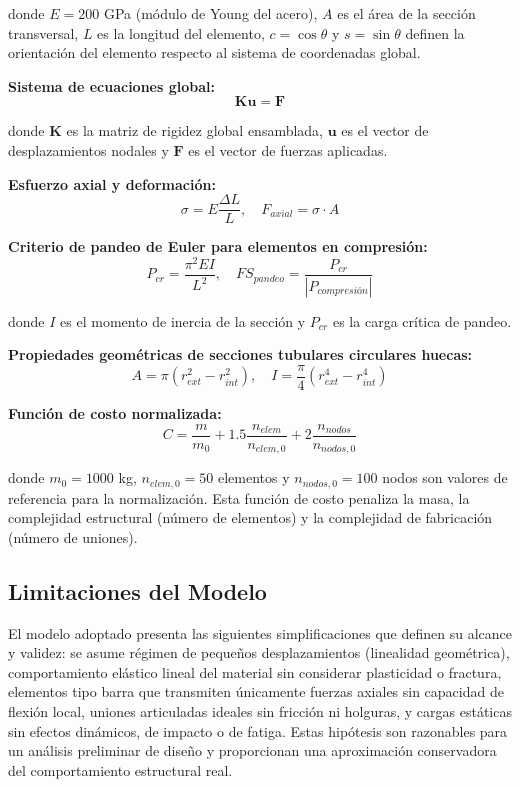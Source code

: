 \documentclass[10pt,a4paper]{article}
\begin{document}
donde $E = 200$ GPa (módulo de Young del acero), $A$ es el área de la sección transversal, $L$ es la longitud del elemento, $c = \cos\theta$ y $s = \sin\theta$ definen la orientación del elemento respecto al sistema de coordenadas global.

\textbf{Sistema de ecuaciones global:}
\begin{equation}
\mathbf{K}\mathbf{u} = \mathbf{F}
\end{equation}

donde $\mathbf{K}$ es la matriz de rigidez global ensamblada, $\mathbf{u}$ es el vector de desplazamientos nodales y $\mathbf{F}$ es el vector de fuerzas aplicadas.

\textbf{Esfuerzo axial y deformación:}
\begin{equation}
\sigma = E \frac{\Delta L}{L}, \quad F_{axial} = \sigma \cdot A
\end{equation}

\textbf{Criterio de pandeo de Euler para elementos en compresión:}
\begin{equation}
P_{cr} = \frac{\pi^2 EI}{L^2}, \quad FS_{pandeo} = \frac{P_{cr}}{|P_{compresión}|}
\end{equation}

donde $I$ es el momento de inercia de la sección y $P_{cr}$ es la carga crítica de pandeo.

\textbf{Propiedades geométricas de secciones tubulares circulares huecas:}
\begin{equation}
A = \pi(r_{ext}^2 - r_{int}^2), \quad I = \frac{\pi}{4}(r_{ext}^4 - r_{int}^4)
\end{equation}

\textbf{Función de costo normalizada:}
\begin{equation}
C = \frac{m}{m_0} + 1.5\frac{n_{elem}}{n_{elem,0}} + 2\frac{n_{nodos}}{n_{nodos,0}}
\end{equation}

donde $m_0 = 1000$ kg, $n_{elem,0} = 50$ elementos y $n_{nodos,0} = 100$ nodos son valores de referencia para la normalización. Esta función de costo penaliza la masa, la complejidad estructural (número de elementos) y la complejidad de fabricación (número de uniones).

\subsection{Limitaciones del Modelo}

El modelo adoptado presenta las siguientes simplificaciones que definen su alcance y validez: se asume régimen de pequeños desplazamientos (linealidad geométrica), comportamiento elástico lineal del material sin considerar plasticidad o fractura, elementos tipo barra que transmiten únicamente fuerzas axiales sin capacidad de flexión local, uniones articuladas ideales sin fricción ni holguras, y cargas estáticas sin efectos dinámicos, de impacto o de fatiga. Estas hipótesis son razonables para un análisis preliminar de diseño y proporcionan una aproximación conservadora del comportamiento estructural real.
\end{document}
